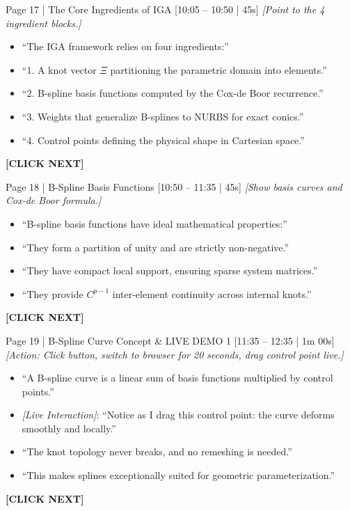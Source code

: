 \documentclass[9pt,a4paper]{article}
\begin{document}
\begin{slidebox}{Page 17 | The Core Ingredients of IGA \hfill [10:05 -- 10:50 | 45s]}
\textit{[Point to the 4 ingredient blocks.]}
\begin{itemize}
  \item ``The IGA framework relies on four ingredients:''
  \item ``1. A knot vector $\Xi$ partitioning the parametric domain into elements.''
  \item ``2. B-spline basis functions computed by the Cox-de Boor recurrence.''
  \item ``3. Weights that generalize B-splines to NURBS for exact conics.''
  \item ``4. Control points defining the physical shape in Cartesian space.''
\end{itemize}
\textbf{\color{cnamred}[CLICK NEXT]}
\end{slidebox}

\begin{slidebox}{Page 18 | B-Spline Basis Functions \hfill [10:50 -- 11:35 | 45s]}
\textit{[Show basis curves and Cox-de Boor formula.]}
\begin{itemize}
  \item ``B-spline basis functions have ideal mathematical properties:''
  \item ``They form a partition of unity and are strictly non-negative.''
  \item ``They have compact local support, ensuring sparse system matrices.''
  \item ``They provide $C^{p-1}$ inter-element continuity across internal knots.''
\end{itemize}
\textbf{\color{cnamred}[CLICK NEXT]}
\end{slidebox}

\begin{slidebox}{Page 19 | B-Spline Curve Concept \& LIVE DEMO 1 \hfill [11:35 -- 12:35 | 1m 00s]}
\textit{[Action: Click button, switch to browser for 20 seconds, drag control point live.]}
\begin{itemize}
  \item ``A B-spline curve is a linear sum of basis functions multiplied by control points.''
  \item \textit{[Live Interaction]}: ``Notice as I drag this control point: the curve deforms smoothly and locally.''
  \item ``The knot topology never breaks, and no remeshing is needed.''
  \item ``This makes splines exceptionally suited for geometric parameterization.''
\end{itemize}
\textbf{\color{cnamred}[CLICK NEXT]}
\end{slidebox}
\end{document}
